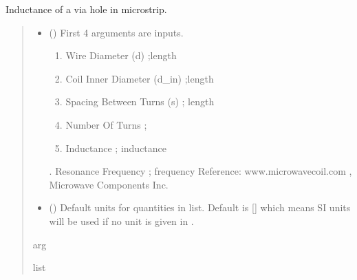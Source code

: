 \documentclass[letterpaper,10pt,english]{sphinxmanual}
\begin{document}

\begin{fulllineitems}
\label{\detokenize{components:components.L_air_core_coil}}
\pysigstartsignatures
{}
\pysigstopsignatures
\sphinxAtStartPar
Inductance of a via hole in microstrip.
\begin{quote}\begin{description}
\begin{itemize}
\item {} 
\sphinxAtStartPar
{} () \textendash{} 
\sphinxAtStartPar
First 4 arguments are inputs.
\begin{enumerate}
%
\item {} 
\sphinxAtStartPar
Wire Diameter (d) ;length

\item {} 
\sphinxAtStartPar
Coil Inner Diameter (d\_in) ;length

\item {} 
\sphinxAtStartPar
Spacing Between Turns (s) ; length

\item {} 
\sphinxAtStartPar
Number Of Turns ;

\item {} 
\sphinxAtStartPar
Inductance ; inductance

\end{enumerate}

. Resonance Frequency ; frequency
Reference:  www.microwavecoil.com , Microwave Components Inc.


\item {} 
\sphinxAtStartPar
{} (\sphinxstyleliteralemphasis{\sphinxupquote{, }}) \textendash{} Default units for quantities in  list. Default is {[}{]} which means SI units will be used if no unit is given in .

\end{itemize}

\sphinxAtStartPar
arg

\sphinxAtStartPar
list

\end{description}\end{quote}

\end{fulllineitems}
\end{document}
